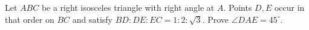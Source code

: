 Let $ABC$ be a right isosceles triangle with right angle at $A$. Points $D,E$ occur in that order on $BC$ and satisfy $BD:DE:EC=1:2:\sqrt3$. Prove $\angle DAE=45^\circ$.
